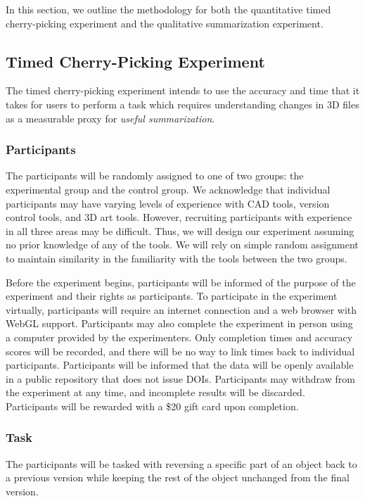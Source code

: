 \documentclass[sigconf,authorversion,nonacm]{acmart}
\begin{document}
In this section, we outline the methodology for both the quantitative timed cherry-picking experiment and the qualitative summarization experiment.

\subsection{Timed Cherry-Picking Experiment}

The timed cherry-picking experiment intends to use the accuracy and time that it takes for users to perform a task which requires understanding changes in 3D files as a measurable proxy for \emph{useful summarization}.

\subsubsection{Participants}

The participants will be randomly assigned to one of two groups: the experimental group and the control group.
We acknowledge that individual participants may have varying levels of experience with CAD tools, version control tools, and 3D art tools.
However, recruiting participants with experience in all three areas may be difficult. Thus, we will design our experiment assuming no prior knowledge of any of the tools.
We will rely on simple random assignment to maintain similarity in the familiarity with the tools between the two groups.

Before the experiment begins, participants will be informed of the purpose of the experiment and their rights as participants.
To participate in the experiment virtually, participants will require an internet connection and a web browser with WebGL support.
Participants may also complete the experiment in person using a computer provided by the experimenters. Only completion times and accuracy scores will be recorded, and there will be no way to link times back to individual participants.
Participants will be informed that the data will be openly available in a public repository that does not issue DOIs. Participants may withdraw from the experiment at any time, and incomplete results will be discarded.
Participants will be rewarded with a \$20 gift card upon completion.

\subsubsection{Task}

The participants will be tasked with reversing a specific part of an object back to a previous version while keeping the rest of the object unchanged from the final version.
\end{document}
